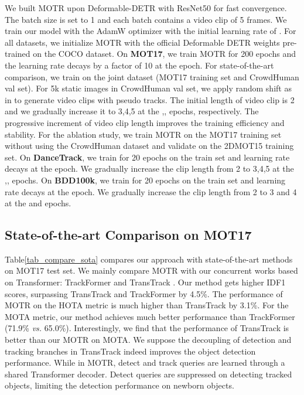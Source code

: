 \documentclass[runningheads]{llncs}
\begin{document}
We built MOTR upon Deformable-DETR \cite{zhu2020deformdetr} with ResNet50 \cite{He2016Resnet} for fast convergence. The batch size is set to 1 and each batch contains a video clip of 5 frames.
We train our model with the AdamW optimizer with the initial learning rate of . For all datasets, we initialize MOTR with the official Deformable DETR \cite{zhu2020deformdetr} weights pre-trained on the COCO \cite{coco14} dataset.
On \textbf{MOT17}, we train MOTR for 200 epochs and the learning rate decays by a factor of 10 at the  epoch.
For state-of-the-art comparison, we train on the joint dataset (MOT17 training set and CrowdHuman \cite{shao2018crowdhuman} val set). For 5k static images in CrowdHuman val set, we apply random shift as in \cite{zhou2020centertrack} to generate video clips with pseudo tracks. The initial length of video clip is 2 and we gradually increase it to 3,4,5 at the ,, epochs, respectively. The progressive increment of video clip length improves the training efficiency and stability. For the ablation study, we train MOTR on the MOT17 training set without using the CrowdHuman dataset and validate on the 2DMOT15 training set.
On \textbf{DanceTrack}, we train for 20 epochs on the train set and learning rate decays at the  epoch. We gradually increase the clip length from 2 to 3,4,5 at the ,, epochs.
On \textbf{BDD100k}, we train for 20 epochs on the train set and learning rate decays at the  epoch. We gradually increase the clip length from 2 to 3 and 4 at the  and  epochs.

\subsection{State-of-the-art Comparison on MOT17}
Table\;\ref{tab_compare_sota} compares our approach with state-of-the-art methods on MOT17 test set. We mainly compare MOTR with our concurrent works based on Transformer: TrackFormer \cite{Meinhardt2021trackformer} and TransTrack \cite{transtrack}. Our method gets higher IDF1 scores, surpassing TransTrack and TrackFormer by 4.5\%. The performance of MOTR on the HOTA metric is much higher than TransTrack by 3.1\%. For the MOTA metric, our method achieves much better performance than TrackFormer (71.9\% \textit{vs.} 65.0\%). Interestingly, we find that the performance of TransTrack is better than our MOTR on MOTA. We suppose the decoupling of detection and tracking branches in TransTrack indeed improves the object detection performance. While in MOTR, detect and track queries are learned through a shared Transformer decoder. Detect queries are suppressed on detecting tracked objects, limiting the detection performance on newborn objects.
\end{document}
